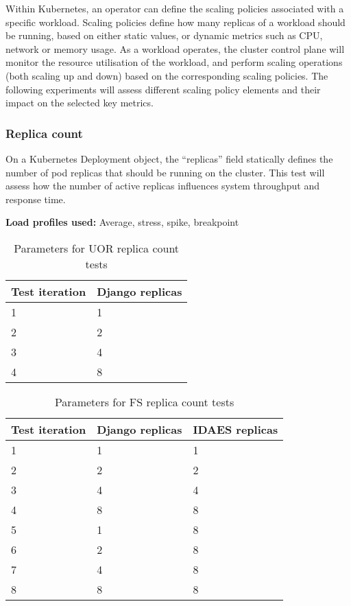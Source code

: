 Within Kubernetes, an operator can define the scaling policies associated with a specific workload. Scaling policies define how many replicas of a workload should be running, based on either static values, or dynamic metrics such as CPU, network or memory usage. As a workload operates, the cluster control plane will monitor the resource utilisation of the workload, and perform scaling operations (both scaling up and down) based on the corresponding scaling policies. The following experiments will assess different scaling policy elements and their impact on the selected key metrics.

\subsubsection{Replica count}

On a Kubernetes Deployment object, the ``replicas'' field statically defines the number of pod replicas that should be running on the cluster. This test will assess how the number of active replicas influences system throughput and response time.

\noindent\textbf{Load profiles used:} Average, stress, spike, breakpoint

\begin{table}[h]
    \centering
    \begin{tabularx}{\textwidth}{|X|X|}
        \hline
        \textbf{Test iteration} & \textbf{Django replicas}  \\ \hline
        1 & 1 \\ \hline
        2 & 2 \\ \hline
        3 & 4 \\ \hline
        4 & 8 \\ \hline
    \end{tabularx}
    \caption{Parameters for UOR replica count tests}
    \label{table:test-replica-count-uor}
\end{table}

\begin{table}[h]
    \centering
    \begin{tabularx}{\textwidth}{|X|X|X|}
        \hline
        \textbf{Test iteration} & \textbf{Django replicas} & \textbf{IDAES replicas}  \\ \hline
        1 & 1 & 1 \\ \hline
        2 & 2 & 2 \\ \hline
        3 & 4 & 4 \\ \hline
        4 & 8 & 8 \\ \hline
        5 & 1 & 8 \\ \hline
        6 & 2 & 8 \\ \hline
        7 & 4 & 8 \\ \hline
        8 & 8 & 8 \\ \hline
    \end{tabularx}
    \caption{Parameters for FS replica count tests}
    \label{table:test-replica-count-fs}
\end{table}

